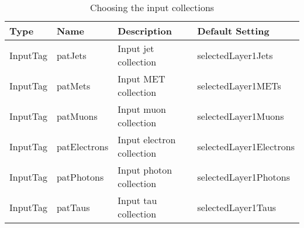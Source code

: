 \documentclass{cmspaper}
\begin{document}
\begin{table}[h]
\caption{Choosing the input collections}
\begin{center}
\begin{tabular}{l|l|l|l}
\textbf{Type} & \textbf{Name} & \textbf{Description} & \textbf{Default
Setting} \\ \hline
InputTag & patJets      & Input jet collection   & selectedLayer1Jets
\\\hline
InputTag & patMets      & Input MET collection   & selectedLayer1METs
\\\hline
InputTag & patMuons     & Input muon collection  & selectedLayer1Muons
\\\hline
InputTag & patElectrons & Input electron collection &
selectedLayer1Electrons 
\\\hline
InputTag & patPhotons   & Input photon collection& selectedLayer1Photons
\\\hline
InputTag & patTaus      & Input tau collection   & selectedLayer1Taus
\end{tabular}
\end{center}
\label{tab:InputCollections}
\end{table}
\end{document}
